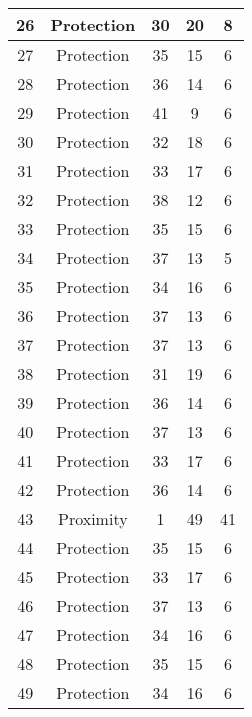 \documentclass[results.tex]{subfiles}
\begin{document}
\begin{center}
\begin{tabular}{| c || c | c | c | c |}
    \hline
    26 & Protection & 30 & 20 & 8 \\ 
    \hline
    27 & Protection & 35 & 15 & 6 \\ 
    \hline
    28 & Protection & 36 & 14 & 6 \\ 
    \hline
    29 & Protection & 41 & 9 & 6 \\ 
    \hline
    30 & Protection & 32 & 18 & 6 \\ 
    \hline
    31 & Protection & 33 & 17 & 6 \\ 
    \hline
    32 & Protection & 38 & 12 & 6 \\ 
    \hline
    33 & Protection & 35 & 15 & 6 \\ 
    \hline
    34 & Protection & 37 & 13 & 5 \\ 
    \hline
    35 & Protection & 34 & 16 & 6 \\ 
    \hline
    36 & Protection & 37 & 13 & 6 \\ 
    \hline
    37 & Protection & 37 & 13 & 6 \\ 
    \hline
    38 & Protection & 31 & 19 & 6 \\ 
    \hline
    39 & Protection & 36 & 14 & 6 \\ 
    \hline
    40 & Protection & 37 & 13 & 6 \\ 
    \hline
    41 & Protection & 33 & 17 & 6 \\ 
    \hline
    42 & Protection & 36 & 14 & 6 \\ 
    \hline
    43 & Proximity & 1 & 49 & 41 \\ 
    \hline
    44 & Protection & 35 & 15 & 6 \\ 
    \hline
    45 & Protection & 33 & 17 & 6 \\ 
    \hline
    46 & Protection & 37 & 13 & 6 \\ 
    \hline
    47 & Protection & 34 & 16 & 6 \\ 
    \hline
    48 & Protection & 35 & 15 & 6 \\ 
    \hline
    49 & Protection & 34 & 16 & 6 \\ 
    \hline   \end{tabular}
\end{center}
\end{document}
